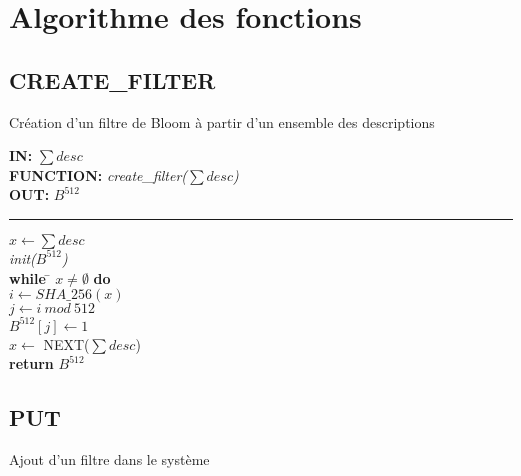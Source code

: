 \chapter{Algorithme des fonctions}
\section{CREATE\_FILTER}
\begin{algorithme}
	Création d'un filtre de Bloom à partir d'un ensemble des descriptions
\end{algorithme}

\begin{flushleft}
	\begin{framed}
		\textbf{IN:} $\sum desc$\\
		\textbf{FUNCTION:} \textit{create\_filter($\sum desc$)}\\
		\textbf{OUT:} \textit{$B^{512}$}\\

		\noindent\rule{\linewidth}{0.5pt}

		\begin{tabbing}
			$x \leftarrow \sum desc$\\
			\textit{init($B^{512}$)}\\
			\textbf{while} \= $x \neq \emptyset$ \textbf{do}\\
					\> $i \leftarrow SHA\_256(x)$\\
					\> $j \leftarrow i\ mod\ 512$\\
					\> $B^{512}[j]\leftarrow 1$\\
					\> $x \leftarrow$ NEXT($\sum desc$)\\
			\textbf{return} $B^{512}$\\
	    	\end{tabbing}		
	\end{framed}
\end{flushleft}

\section{PUT}
\begin{algorithme}
	Ajout d'un filtre dans le système
\end{algorithme}

